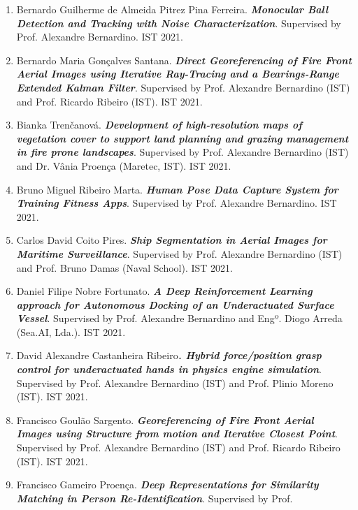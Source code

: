 \documentclass[
]{article}
\begin{document}
\begin{enumerate}
{{  simulation, analytic linearization and optimal control of a 6
  tendon-driven biomimetic eye: a tool for studying human oculomotor
  control}}. Supervised by Alexandre Bernardino (IST) and Prof. John van
  Opstal (Radboud Univ, Nijmegen, Netherlands). IST 2021.
\item
  Bernardo Guilherme de Almeida Pitrez Pina Ferreira.
  \emph{\textbf{Monocular Ball Detection and Tracking with Noise
  Characterization}}. Supervised by Prof. Alexandre Bernardino. IST
  2021.
\item
  Bernardo Maria Gonçalves Santana. \emph{\textbf{Direct Georeferencing
  of Fire Front Aerial Images using Iterative Ray-Tracing and a
  Bearings-Range Extended Kalman Filter}}. Supervised by Prof. Alexandre
  Bernardino (IST) and Prof. Ricardo Ribeiro (IST). IST 2021.
\item
  Bianka Trenčanová. \emph{\textbf{Development of high-resolution maps
  of vegetation cover to support land planning and grazing management in
  fire prone landscapes}}. Supervised by Prof. Alexandre Bernardino
  (IST) and Dr. Vânia Proença (Maretec, IST). IST 2021.
\item
  Bruno Miguel Ribeiro Marta. \emph{\textbf{Human Pose Data Capture
  System for Training Fitness Apps}}. Supervised by Prof. Alexandre
  Bernardino. IST 2021.
\item
  Carlos David Coito Pires. \emph{\textbf{Ship Segmentation in Aerial
  Images for Maritime Surveillance}}. Supervised by Prof. Alexandre
  Bernardino (IST) and Prof. Bruno Damas (Naval School). IST 2021.
\item
  Daniel Filipe Nobre Fortunato. \emph{\textbf{A Deep Reinforcement
  Learning approach for Autonomous Docking of an Underactuated Surface
  Vessel}}. Supervised by Prof. Alexandre Bernardino and Engº. Diogo
  Arreda (Sea.AI, Lda.). IST 2021.
\item
  David Alexandre Castanheira Ribeiro\emph{\textbf{. Hybrid
  force/position grasp control for underactuated hands in physics engine
  simulation}}. Supervised by Prof. Alexandre Bernardino (IST) and Prof.
  Plinio Moreno (IST). IST 2021.
\item
  Francisco Goulão Sargento. \emph{\textbf{Georeferencing of Fire Front
  Aerial Images using Structure from motion and Iterative Closest
  Point}}. Supervised by Prof. Alexandre Bernardino (IST) and Prof.
  Ricardo Ribeiro (IST). IST 2021.
\item
  Francisco Gameiro Proença. \emph{\textbf{Deep Representations for
  Similarity Matching in Person Re-Identification}}. Supervised by Prof.

\end{enumerate}
\end{document}
